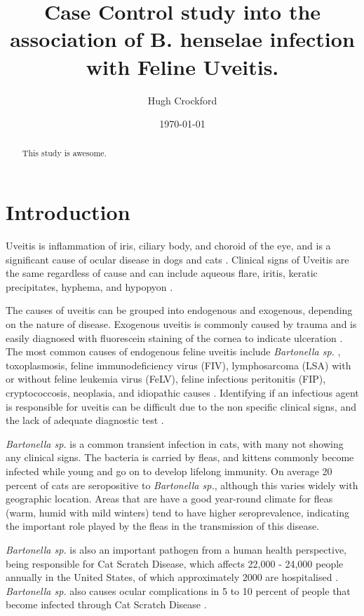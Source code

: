 \documentclass[11pt,twocolumn]{article}
\title{Case Control study into the association of B. henselae infection with Feline Uveitis.}
\author{Hugh Crockford}
\date{\today}
\begin{document}
	\maketitle

\begin{abstract}
	This study is awesome.
\end{abstract}

	\section{Introduction}
		Uveitis is inflammation of iris, ciliary body, and choroid of the eye, and is a significant cause of ocular disease in dogs and cats \cite{Townsend2008}. 
		Clinical signs of Uveitis are the same regardless of cause and can include aqueous flare, iritis, keratic precipitates, hyphema, and hypopyon \cite{Powell2010}.


		The causes of uveitis can be grouped into endogenous and exogenous, depending on the nature of disease. Exogenous uveitis is commonly caused by trauma and is easily diagnosed with fluorescein staining of the cornea to indicate ulceration \cite{Fontenelle2008}.
		The most common causes of endogenous feline uveitis include \emph{Bartonella sp.} , toxoplasmosis, feline immunodeficiency virus (FIV), lymphosarcoma (LSA) with or without feline leukemia virus (FeLV), feline infectious peritonitis (FIP), cryptococcosis, neoplasia, and idiopathic causes \cite{Powell2001}.
		Identifying if an infectious agent is responsible for uveitis can be difficult due to the non specific clinical signs, and the lack of adequate diagnostic test \cite{Fontenelle2008}.


		\emph{Bartonella sp.} is a common transient infection in cats, with many not showing any clinical signs. 
		The bacteria is carried by fleas, and kittens commonly become infected while young and go on to develop lifelong immunity.
		On average 20 percent of cats are seropositive to \emph{Bartonella sp.}, although this varies widely with geographic location\cite{Jameson1995a}. Areas that are have a good year-round climate for fleas (warm, humid with mild winters) tend to have higher seroprevalence, indicating the important role played by the fleas in the transmission of this disease.


		\emph{Bartonella sp.} is also an important pathogen from a human health perspective, being responsible for Cat Scratch Disease, which affects 22,000 - 24,000 people annually in the United States, of which approximately 2000 are hospitalised \cite{Jackson1993}.
		\emph{Bartonella sp.} also causes ocular complications in 5 to 10 percent of people that become infected through Cat Scratch Disease \cite{Wade2000}.
	
\end{document}
